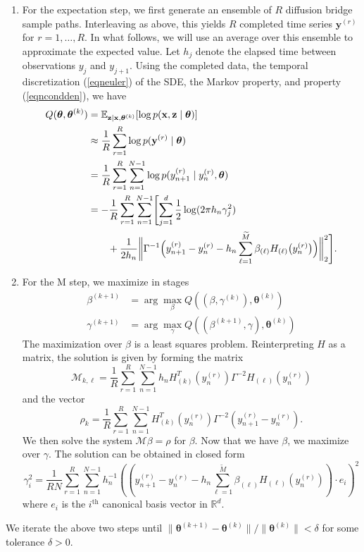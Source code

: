\documentclass{article}
\newcommand{\btheta}{\ensuremath{\bm{\theta}}}
\newcommand{\bx}{\ensuremath{\mathbf{x}}}
\newcommand{\by}{\ensuremath{\mathbf{y}}}
\newcommand{\bz}{\ensuremath{\mathbf{z}}}
\begin{document}
\begin{enumerate}
\item For the expectation step, we first generate an ensemble of $R$ diffusion bridge sample paths.  Interleaving as above, this yields $R$ completed time series $\by^{(r)}$ for $r = 1, \ldots, R$.  In what follows, we will use an average over this ensemble to approximate the expected value.  Let $h_j$ denote the elapsed time between observations $y_j$ and $y_{j+1}$.  Using the completed data, the temporal discretization (\ref{eqneuler}) of the SDE, the Markov property, and property (\ref{eqncondden}), we have
\begin{align}
\label{eqnqfun}
Q(\btheta, \btheta^{(k)}) &= \mathbb{E}_{\bz \mid \bx, \btheta^{(k)}} [\log p(\bx, \bz \mid \btheta)] \\
 &\approx \frac{1}{R} \sum_{r=1}^R \log p(\by^{(r)} \mid \btheta) \nonumber \\
 &= \frac{1}{R} \sum_{r=1}^R \sum_{n=1}^{N-1} \log p(y_{n+1}^{(r)} \mid y_n^{(r)}, \btheta) \nonumber \\
 &= -\frac{1}{R} \sum_{r=1}^R \sum_{n=1}^{N-1} \Biggl[ \sum_{j=1}^d \frac{1}{2} \log(2 \pi h_n \gamma_j^2) \nonumber \\
 &\qquad + \frac{1}{2h_n} \biggl\| \Gamma^{-1} \Bigl(y_{n+1}^{(r)} - y_n^{(r)} - h_n \sum_{\ell=1}^{\widetilde{M}} \beta_{(\ell)} H_{(\ell)}\bigl(y_n^{(r)}\bigr)\Bigr) \biggr\|_2^2 \Biggr].
\end{align}
\item For the M step, we maximize in stages
\begin{align*}
\beta^{(k+1)} &= \arg \max_{\beta} Q( (\beta, \gamma^{(k)}), \btheta^{(k)}) \\
\gamma^{(k+1)} &= \arg \max_{\gamma} Q( (\beta^{(k+1)}, \gamma), \btheta^{(k)})
\end{align*}
The maximization over $\beta$ is a least squares problem.  Reinterpreting $H$ as a matrix, the solution is given by forming the matrix
\begin{equation}
\label{eqnestM}
\mathcal{M}_{k,\ell} = \frac{1}{R} \sum_{r=1}^{R} \sum_{n=1}^{N-1} h_n H_{(k)}^T (y_{n}^{(r)}) \Gamma^{-2} H_{(\ell)} (y_{n}^{(r)})
\end{equation}
and the vector
\begin{equation}
\label{eqnestrho}
\rho_k = \frac{1}{R} \sum_{r=1}^{R} \sum_{n=1}^{N-1} H_{(k)}^T (y_{n}^{(r)}) \Gamma^{-2} (y_{n+1}^{(r)} - y_{n}^{(r)}).
\end{equation}
We then solve the system $\mathcal{M} \beta = \rho$ for $\beta$.  Now that we have $\beta$, we maximize over $\gamma$.  The solution can be obtained in closed form
\begin{equation}
\label{eqnestgamma}
\gamma_i^2 = \frac{1}{R N} \sum_{r=1}^{R} \sum_{n=1}^{N-1} h_n^{-1} (( y_{n+1}^{(r)} - y_{n}^{(r)} - h_n \sum_{\ell=1}^{\widetilde{M}} \beta_{(\ell)} H_{(\ell)} (y_{n}^{(r)}) ) \cdot e_i )^2
\end{equation}
where $e_i$ is the $i^\text{th}$ canonical basis vector in $\mathbb{R}^d$.
\end{enumerate}
We iterate the above two steps until $\| \btheta^{(k+1)} - \btheta^{(k)} \|/\| \btheta^{(k)} \| < \delta$ for some tolerance $\delta > 0$.
\end{document}

